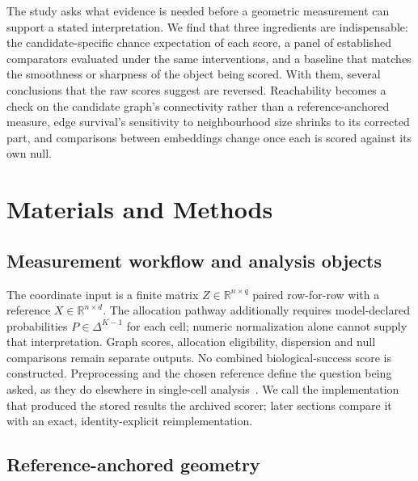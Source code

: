 \documentclass[11pt]{article}
\begin{document}
The study asks what evidence is needed before a geometric measurement can support a stated interpretation. We find that three ingredients are indispensable: the candidate-specific chance expectation of each score, a panel of established comparators evaluated under the same interventions, and a baseline that matches the smoothness or sharpness of the object being scored. With them, several conclusions that the raw scores suggest are reversed. Reachability becomes a check on the candidate graph's connectivity rather than a reference-anchored measure, edge survival's sensitivity to neighbourhood size shrinks to its corrected part, and comparisons between embeddings change once each is scored against its own null.

\section{Materials and Methods}

\subsection{Measurement workflow and analysis objects}

The coordinate input is a finite matrix $Z\in\mathbb R^{n\times q}$ paired row-for-row with a reference $X\in\mathbb R^{n\times d}$. The allocation pathway additionally requires model-declared probabilities $P\in\Delta^{K-1}$ for each cell; numeric normalization alone cannot supply that interpretation. Graph scores, allocation eligibility, dispersion and null comparisons remain separate outputs. No combined biological-success score is constructed. Preprocessing and the chosen reference define the question being asked, as they do elsewhere in single-cell analysis~\cite{luecken2019practices}. We call the implementation that produced the stored results the archived scorer; later sections compare it with an exact, identity-explicit reimplementation.

\subsection{Reference-anchored geometry}
\end{document}
